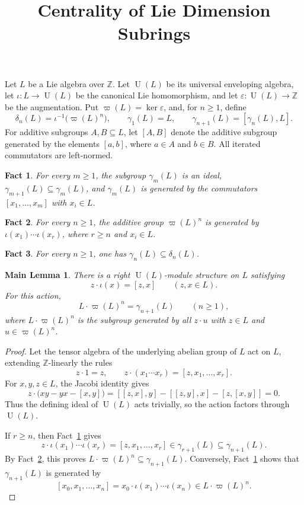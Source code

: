 \documentclass[a4paper,11pt,reqno]{amsart}
\title{Centrality of Lie Dimension Subrings}
\author{}
\date{}
\newtheorem{fact}{Fact}
\newtheorem*{mainlemma}{Main Lemma}
\newcommand{\Z}{\mathbb Z}
\newcommand{\U}{\operatorname U}
\newcommand{\w}{\varpi}
\newcommand{\dlt}{\delta}
\newcommand{\g}{\gamma}
\begin{document}
\maketitle
\vspace{-1.2em}

Let \(L\) be a Lie algebra over \(\Z\). Let \(\U(L)\) be its universal
 enveloping algebra, let \(\iota\colon L\to\U(L)\) be the canonical Lie
homomorphism, and let \(\varepsilon\colon\U(L)\to\Z\) be the augmentation.
Put \(\w(L)=\ker\varepsilon\), and, for \(n\geq1\), define
\[
  \dlt_n(L)=\iota^{-1}\bigl(\w(L)^n\bigr),\qquad
  \g_1(L)=L,\qquad \g_{n+1}(L)=[\g_n(L),L].
\]
For additive subgroups \(A,B\subseteq L\), let \([A,B]\) denote the
additive subgroup generated by the elements \([a,b]\), where \(a\in A\)
and \(b\in B\). All iterated commutators are left-normed.

\begin{fact}\label{fact:lcs}
For every \(m\geq1\), the subgroup \(\g_m(L)\) is an ideal,
\(\g_{m+1}(L)\subseteq\g_m(L)\), and \(\g_m(L)\) is generated by the
commutators \([x_1,\ldots,x_m]\) with \(x_i\in L\).
\end{fact}

\begin{fact}\label{fact:augmentation}
For every \(n\geq1\), the additive group \(\w(L)^n\) is generated by
\(\iota(x_1)\cdots\iota(x_r)\), where \(r\geq n\) and \(x_i\in L\).
\end{fact}

\begin{fact}\label{fact:standard}
For every \(n\geq1\), one has \(\g_n(L)\subseteq\dlt_n(L)\).
\end{fact}

\begin{mainlemma}
There is a right \(\U(L)\)-module structure on \(L\) satisfying
\[
  z\cdot\iota(x)=[z,x]\qquad(z,x\in L).
\]
For this action,
\[
  L\cdot\w(L)^n=\g_{n+1}(L)\qquad(n\geq1),
\]
where \(L\cdot\w(L)^n\) is the subgroup generated by all \(z\cdot u\) with
\(z\in L\) and \(u\in\w(L)^n\).
\end{mainlemma}

\begin{proof}
Let the tensor algebra of the underlying abelian group of \(L\) act on
\(L\), extending \(\Z\)-linearly the rules
\[
  z\cdot1=z,\qquad z\cdot(x_1\cdots x_r)=[z,x_1,\ldots,x_r].
\]
For \(x,y,z\in L\), the Jacobi identity gives
\[
 z\cdot\bigl(xy-yx-[x,y]\bigr)
 =[[z,x],y]-[[z,y],x]-[z,[x,y]]=0.
\]
Thus the defining ideal of \(\U(L)\) acts trivially, so the action factors
through \(\U(L)\).

If \(r\geq n\), then Fact~\ref{fact:lcs} gives
\[
 z\cdot\iota(x_1)\cdots\iota(x_r)
 =[z,x_1,\ldots,x_r]\in\g_{r+1}(L)\subseteq\g_{n+1}(L).
\]
By Fact~\ref{fact:augmentation}, this proves
\(L\cdot\w(L)^n\subseteq\g_{n+1}(L)\). Conversely, Fact~\ref{fact:lcs}
shows that \(\g_{n+1}(L)\) is generated by
\[
 [x_0,x_1,\ldots,x_n]
 =x_0\cdot\iota(x_1)\cdots\iota(x_n)\in L\cdot\w(L)^n.
\]
\end{proof}
\end{document}
